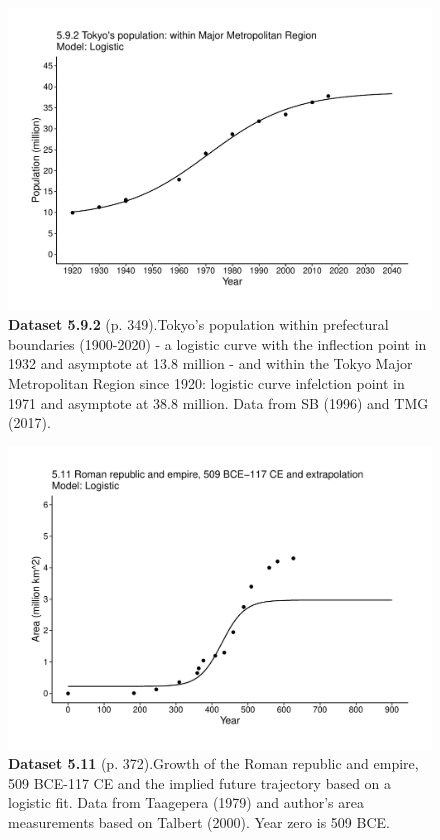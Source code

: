 \documentclass[aps,rmp,preprint,superscriptaddress,10pt,onecolumn]{article}
\begin{document}
\clearpage
\begin{figure}[h]
\includegraphics[width=\textwidth]{output/figs-ggplot/5.9.2.pdf}
\caption*{\textbf{Dataset 5.9.2} (p. 349).Tokyo's population within prefectural boundaries (1900-2020) - a logistic curve with the inflection point in 1932 and asymptote at 13.8 million - and within the Tokyo Major Metropolitan Region since 1920: logistic curve infelction point in 1971 and asymptote at 38.8 million. Data from SB (1996) and TMG (2017). }
\end{figure}
	
\clearpage
\begin{figure}[h]
\includegraphics[width=\textwidth]{output/figs-ggplot/5.11.pdf}
\caption*{\textbf{Dataset 5.11} (p. 372).Growth of the Roman republic and empire, 509 BCE-117 CE and the implied future trajectory based on a logistic fit. Data from Taagepera (1979) and author's area measurements based on Talbert (2000). Year zero is 509 BCE. }
\end{figure}
	
\end{document}
